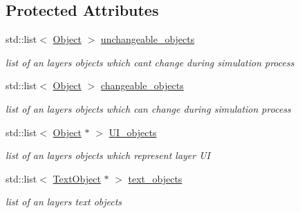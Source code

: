 \subsection*{Protected Attributes}
\begin{DoxyCompactItemize}
\item 
\mbox{\label{class_layer_ada06fdf26fe10efb2bb66ada8d10d3e0}} 
std\+::list$<$ \hyperlink{class_object}{Object} $>$ \hyperlink{class_layer_ada06fdf26fe10efb2bb66ada8d10d3e0}{unchangeable\+\_\+objects}
\begin{DoxyCompactList}\small\item\em list of an layers objects which can\textquotesingle{}t change during simulation process \end{DoxyCompactList}\item 
\mbox{\label{class_layer_a6e160468d3c84bba8324a11b05be6b6e}} 
std\+::list$<$ \hyperlink{class_object}{Object} $>$ \hyperlink{class_layer_a6e160468d3c84bba8324a11b05be6b6e}{changeable\+\_\+objects}
\begin{DoxyCompactList}\small\item\em list of an layers objects which can change during simulation process \end{DoxyCompactList}\item 
\mbox{\label{class_layer_a98666cc5fd94f591c3e9ffccc02ee45c}} 
std\+::list$<$ \hyperlink{class_object}{Object} $\ast$ $>$ \hyperlink{class_layer_a98666cc5fd94f591c3e9ffccc02ee45c}{U\+I\+\_\+objects}
\begin{DoxyCompactList}\small\item\em list of an layers objects which represent layer UI \end{DoxyCompactList}\item 
\mbox{\label{class_layer_a46c6bac93a96f1afc853aca03a42351a}} 
std\+::list$<$ \hyperlink{class_text_object}{Text\+Object} $\ast$ $>$ \hyperlink{class_layer_a46c6bac93a96f1afc853aca03a42351a}{text\+\_\+objects}
\begin{DoxyCompactList}\small\item\em list of an layers text objects \end{DoxyCompactList}\item 
\mbox{\label{class_layer_a0bfe2f79d24415f8619a4a7491bf1fd8}} 

\end{DoxyCompactItemize}
